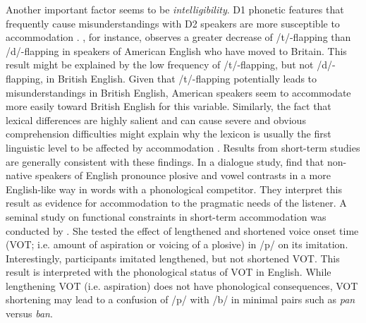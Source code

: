 \documentclass[output=paper]{langscibook}
\begin{document}
Another important factor seems to be \textit{intelligibility}. D1 phonetic features that frequently cause misunderstandings with D2 speakers are more susceptible to accommodation \citep{trudgill_dialects_1986}. \citet{shockey_all_1984}, for instance, observes a greater decrease of /t/-flapping than /d/-flapping in speakers of American English who have moved to Britain. This result might be explained by the low frequency of /t/-flapping, but not /d/-flapping, in British English. Given that /t/-flapping potentially leads to misunderstandings in British English, American speakers seem to accommodate more easily toward British English for this variable. Similarly, the fact that lexical differences are highly salient and can cause severe and obvious comprehension difficulties \citep{trudgill_dialects_1986} might explain why the lexicon is usually the first linguistic level to be affected by accommodation \citep{Bonomi2010,chambers_dialect_1992}.
Results from short-term studies are generally consistent with these findings. In a dialogue study, \textcite{hwang_phonetic_2015} find that non-native speakers of English pronounce plosive and vowel contrasts in a more English-like way in words with a phonological competitor. They interpret this result as evidence for accommodation to the pragmatic needs of the listener.
A seminal study on functional constraints in short-term accommodation was conducted by \citet{nielsen_specificity_2011}. She tested the effect of lengthened and shortened voice onset time (VOT; i.e. amount of aspiration or voicing of a plosive) in /p/ on its imitation. Interestingly, participants imitated lengthened, but not shortened VOT. This result is interpreted with the phonological status of VOT in English. While lengthening VOT (i.e. aspiration) does not have phonological consequences, VOT shortening may lead to a confusion of /p/ with /b/ in minimal pairs such as \textit{pan} versus \textit{ban}.
\end{document}

